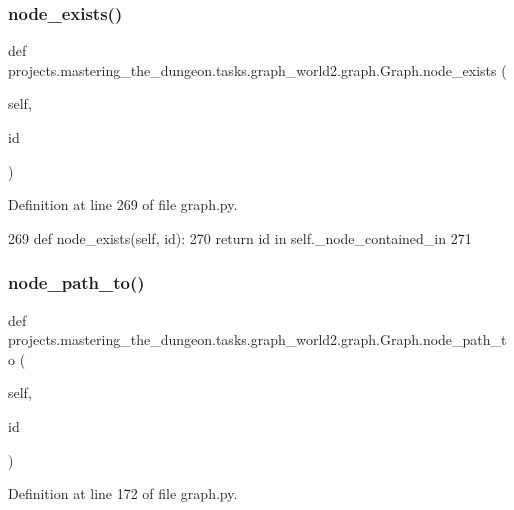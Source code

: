 \subsubsection{\texorpdfstring{node\+\_\+exists()}{node\_exists()}}
{\footnotesize\ttfamily def projects.\+mastering\+\_\+the\+\_\+dungeon.\+tasks.\+graph\+\_\+world2.\+graph.\+Graph.\+node\+\_\+exists (\begin{DoxyParamCaption}\item[{}]{self,  }\item[{}]{id }\end{DoxyParamCaption})}



Definition at line 269 of file graph.\+py.


\begin{DoxyCode}
269     \textcolor{keyword}{def }node\_exists(self, id):
270         \textcolor{keywordflow}{return} id \textcolor{keywordflow}{in} self.\_node\_contained\_in
271 
\end{DoxyCode}
\mbox{\label{classprojects_1_1mastering__the__dungeon_1_1tasks_1_1graph__world2_1_1graph_1_1Graph_a81d2f214566e08e4ddc4414c4284fbe4}} 
\subsubsection{\texorpdfstring{node\+\_\+path\+\_\+to()}{node\_path\_to()}}
{\footnotesize\ttfamily def projects.\+mastering\+\_\+the\+\_\+dungeon.\+tasks.\+graph\+\_\+world2.\+graph.\+Graph.\+node\+\_\+path\+\_\+to (\begin{DoxyParamCaption}\item[{}]{self,  }\item[{}]{id }\end{DoxyParamCaption})}



Definition at line 172 of file graph.\+py.


